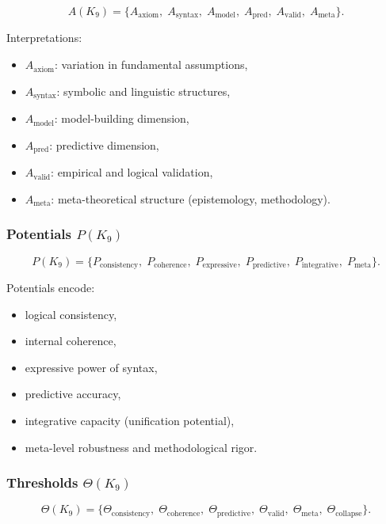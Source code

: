 \[
A(K_9)=
\{
A_{\mathrm{axiom}},\;
A_{\mathrm{syntax}},\;
A_{\mathrm{model}},\;
A_{\mathrm{pred}},\;
A_{\mathrm{valid}},\;
A_{\mathrm{meta}}
\}.
\]

Interpretations:
\begin{itemize}
    \item $A_{\mathrm{axiom}}$: variation in fundamental assumptions,
    \item $A_{\mathrm{syntax}}$: symbolic and linguistic structures,
    \item $A_{\mathrm{model}}$: model-building dimension,
    \item $A_{\mathrm{pred}}$: predictive dimension,
    \item $A_{\mathrm{valid}}$: empirical and logical validation,
    \item $A_{\mathrm{meta}}$: meta-theoretical structure (epistemology, methodology).
\end{itemize}

\subsubsection{Potentials \texorpdfstring{$P(K_9)$}{P(K_9)}}

\[
P(K_9)=
\{
P_{\mathrm{consistency}},\;
P_{\mathrm{coherence}},\;
P_{\mathrm{expressive}},\;
P_{\mathrm{predictive}},\;
P_{\mathrm{integrative}},\;
P_{\mathrm{meta}}
\}.
\]

Potentials encode:
\begin{itemize}
    \item logical consistency,
    \item internal coherence,
    \item expressive power of syntax,
    \item predictive accuracy,
    \item integrative capacity (unification potential),
    \item meta-level robustness and methodological rigor.
\end{itemize}

\subsubsection{Thresholds \texorpdfstring{$\Theta(K_9)$}{\Theta(K_9)}}

\[
\Theta(K_9)=
\{
\Theta_{\mathrm{consistency}},\;
\Theta_{\mathrm{coherence}},\;
\Theta_{\mathrm{predictive}},\;
\Theta_{\mathrm{valid}},\;
\Theta_{\mathrm{meta}},\;
\Theta_{\mathrm{collapse}}
\}.
\]

